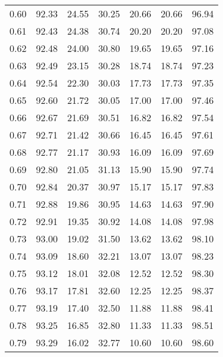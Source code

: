 \begin{tabular}{|c|c|c|c|c|c|c|}
      0.60 &     92.33 &     24.55 &      30.25 &   20.66 &      20.66 &         96.94 \\
      0.61 &     92.43 &     24.38 &      30.74 &   20.20 &      20.20 &         97.08 \\
      0.62 &     92.48 &     24.00 &      30.80 &   19.65 &      19.65 &         97.16 \\
      0.63 &     92.49 &     23.15 &      30.28 &   18.74 &      18.74 &         97.23 \\
      0.64 &     92.54 &     22.30 &      30.03 &   17.73 &      17.73 &         97.35 \\
      0.65 &     92.60 &     21.72 &      30.05 &   17.00 &      17.00 &         97.46 \\
      0.66 &     92.67 &     21.69 &      30.51 &   16.82 &      16.82 &         97.54 \\
      0.67 &     92.71 &     21.42 &      30.66 &   16.45 &      16.45 &         97.61 \\
      0.68 &     92.77 &     21.17 &      30.93 &   16.09 &      16.09 &         97.69 \\
      0.69 &     92.80 &     21.05 &      31.13 &   15.90 &      15.90 &         97.74 \\
      0.70 &     92.84 &     20.37 &      30.97 &   15.17 &      15.17 &         97.83 \\
      0.71 &     92.88 &     19.86 &      30.95 &   14.63 &      14.63 &         97.90 \\
      0.72 &     92.91 &     19.35 &      30.92 &   14.08 &      14.08 &         97.98 \\
      0.73 &     93.00 &     19.02 &      31.50 &   13.62 &      13.62 &         98.10 \\
      0.74 &     93.09 &     18.60 &      32.21 &   13.07 &      13.07 &         98.23 \\
      0.75 &     93.12 &     18.01 &      32.08 &   12.52 &      12.52 &         98.30 \\
      0.76 &     93.17 &     17.81 &      32.60 &   12.25 &      12.25 &         98.37 \\
      0.77 &     93.19 &     17.40 &      32.50 &   11.88 &      11.88 &         98.41 \\
      0.78 &     93.25 &     16.85 &      32.80 &   11.33 &      11.33 &         98.51 \\
      0.79 &     93.29 &     16.02 &      32.77 &   10.60 &      10.60 &         98.60 \\

\end{tabular}
